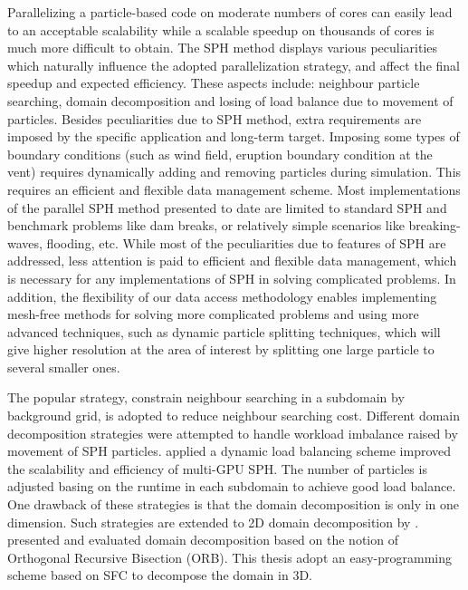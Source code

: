 Parallelizing a particle-based code on moderate numbers of cores can easily lead to an acceptable scalability while a scalable speedup on thousands of cores is much more difficult to obtain. The SPH method displays various peculiarities which naturally influence the adopted parallelization strategy, and affect the final speedup and expected efficiency. These aspects include: neighbour particle searching, domain decomposition and losing of load balance due to movement of particles. Besides peculiarities due to SPH method, extra requirements are imposed by the specific application and long-term target. Imposing some types of boundary conditions (such as wind field, eruption boundary condition at the vent) requires dynamically adding and removing particles during simulation. This requires an efficient and flexible data management scheme. Most implementations of the parallel SPH method presented to date are limited to standard SPH and benchmark problems like dam breaks, or relatively simple scenarios like breaking-waves, flooding, etc. While most of the peculiarities due to features of SPH are addressed, less attention is paid to efficient and flexible data management, which is necessary for any implementations of SPH in solving complicated problems. In addition, the flexibility of our data access methodology enables implementing mesh-free methods for solving more complicated problems and using more advanced techniques, such as dynamic particle splitting techniques\cite{vacondio2012accurate, feldman2007dynamic}, which will give higher resolution at the area of interest by splitting one large particle to several smaller ones.

The popular strategy, constrain neighbour searching in a subdomain by background grid, is adopted to reduce neighbour searching cost. Different domain decomposition strategies were attempted to handle workload imbalance raised by movement of SPH particles. \citet{dominguez2013new} applied a dynamic load balancing scheme improved the scalability and efficiency of multi-GPU SPH. The number of particles is adjusted basing on the runtime in each subdomain to achieve good load balance. One drawback of these strategies is that the domain decomposition is only in one dimension. Such strategies are extended to 2D domain decomposition by \citet{rustico2014advances}. \citet{oger2016distributed} presented and evaluated domain decomposition based on the notion of Orthogonal Recursive Bisection (ORB). This thesis adopt an easy-programming scheme based on SFC \cite{patra1999efficient} to decompose the domain in 3D.

